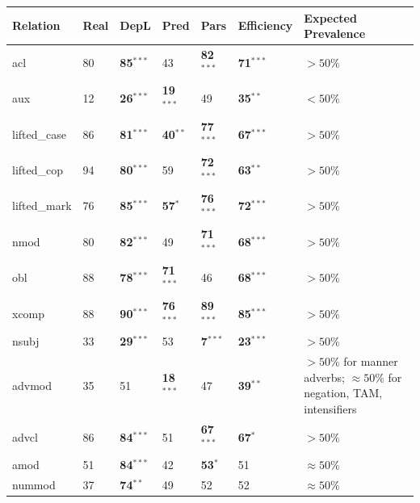 \documentclass[12pt]{article}
\begin{document}
\begin{table} %
	\begin{center}
	
\tiny{
\begin{tabular}{|l|l|l|ll|l|l|}
	\hline
	Relation & Real & DepL & Pred & Pars & Efficiency & Expected Prevalence  \\ \hline
acl  &  80   &   \textbf{85}$^{***}$   &   43   &   \textbf{82}$^{***}$   &   \textbf{71}$^{***}$  & $>50\%$  \citep{dryer1992greenbergian} \\
aux  &  12   &   \textbf{26}$^{***}$   &   \textbf{19}$^{***}$   &   49   &   \textbf{35}$^{**}$  & $<50\%$ \citep{dryer1992greenbergian} \\
lifted\_case  &  86   &   \textbf{81}$^{***}$   &   \textbf{40}$^{**}$   &   \textbf{77}$^{***}$   &   \textbf{67}$^{***}$ & $> 50 \%$ \citep{dryer1992greenbergian}  \\
lifted\_cop  &  94   &   \textbf{80}$^{***}$   &   59   &   \textbf{72}$^{***}$   &   \textbf{63}$^{**}$  & $> 50 \%$ \citep{dryer1992greenbergian} \\
lifted\_mark  &  76   &   \textbf{85}$^{***}$   &   \textbf{57}$^{*}$   &   \textbf{76}$^{***}$   &   \textbf{72}$^{***}$  & $> 50 \%$ \citep{dryer1992greenbergian} \\
nmod  &  80   &   \textbf{82}$^{***}$   &   49   &   \textbf{71}$^{***}$   &   \textbf{68}$^{***}$  & $> 50 \%$ \citep{dryer1992greenbergian} \\ 
obl  &  88   &   \textbf{78}$^{***}$   &   \textbf{71}$^{***}$   &   46   &   \textbf{68}$^{***}$  &  $> 50 \%$ \citep{dryer1992greenbergian} \\
xcomp  &  88   &   \textbf{90}$^{***}$   &   \textbf{76}$^{***}$   &   \textbf{89}$^{***}$   &   \textbf{85}$^{***}$  &  $> 50 \%$ \citep{dryer1992greenbergian} \\
\hdashline
nsubj  &  33   &   \textbf{29}$^{***}$   &   53   &   \textbf{7}$^{***}$   &   \textbf{23}$^{***}$  & $> 50 \%$ \citep{dryer1992greenbergian} \\
advmod  &  35   &   51   &   \textbf{18}$^{***}$   &   47   &   \textbf{39}$^{**}$  & $>50\%$ for manner adverbs; $\approx 50\%$ for negation, TAM, intensifiers \citep{dryer1992greenbergian} \\

\hline
advcl  &  86   &   \textbf{84}$^{***}$   &   51   &   \textbf{67}$^{***}$   &   \textbf{67}$^{*}$  & $>50\%$ \citep{greenberg1963universals,diessel2001ordering} \\
amod  &  51   &   \textbf{84}$^{***}$   &   42   &   \textbf{53}$^{*}$   &   51   & $\approx 50\%$ \citep{dryer1992greenbergian} \\
nummod  &  37   &   \textbf{74}$^{**}$   &   49   &   52   &   52 & $\approx 50\%$ \citep[][89A vs. 83A]{wals} \\


\end{tabular}}
\end{center}
\end{table}
\end{document}
